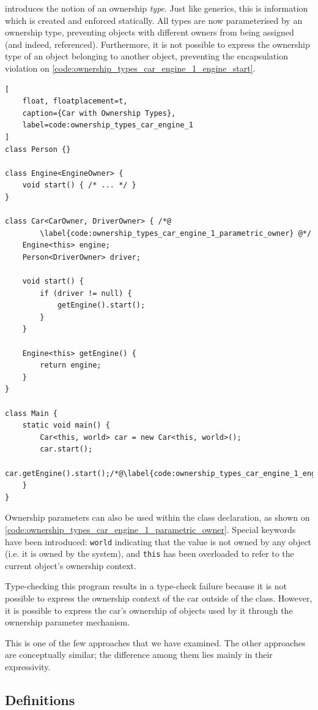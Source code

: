\documentclass{acm_proc_article-sp}
\begin{document}
 introduces the notion of an ownership
\emph{type}. Just like generics, this is information which is created and
enforced statically. All types are now parameterised by an ownership type,
preventing objects with different owners from being assigned (and indeed,
referenced). Furthermore, it is not possible to express the ownership type of
an object belonging to another object, preventing the encapsulation violation
on \cref{code:ownership_types_car_engine_1_engine_start}.

\begin{lstlisting}[
	float, floatplacement=t,
	caption={Car with Ownership Types},
	label=code:ownership_types_car_engine_1
]
class Person {}

class Engine<EngineOwner> {
	void start() { /* ... */ }
}

class Car<CarOwner, DriverOwner> { /*@
		\label{code:ownership_types_car_engine_1_parametric_owner} @*/
	Engine<this> engine;
	Person<DriverOwner> driver;

	void start() {
		if (driver != null) {
			getEngine().start();
		}
	}

	Engine<this> getEngine() {
		return engine;
	}
}

class Main {
	static void main() {
		Car<this, world> car = new Car<this, world>();
		car.start();
		car.getEngine().start();/*@\label{code:ownership_types_car_engine_1_engine_start}@*/
	}
}
\end{lstlisting}

Ownership parameters can also be used within the class declaration, as shown on
\cref{code:ownership_types_car_engine_1_parametric_owner}. Special keywords
have been introduced: \lstinline|world| indicating that the value is not owned
by any object (i.e. it is owned by the system), and \lstinline|this| has been
overloaded to refer to the current object's ownership context.

Type-checking this program results in a type-check failure because it is not
possible to express the ownership context of the car outside of the class.
However, it is possible to express the car's ownership of objects used by it
through the ownership parameter mechanism.

This is one of the few approaches that we have examined. The other approaches
are conceptually similar; the difference among them lies mainly in their
expressivity.

\subsection{Definitions}
\label{subsec:definitions}
\end{document}
